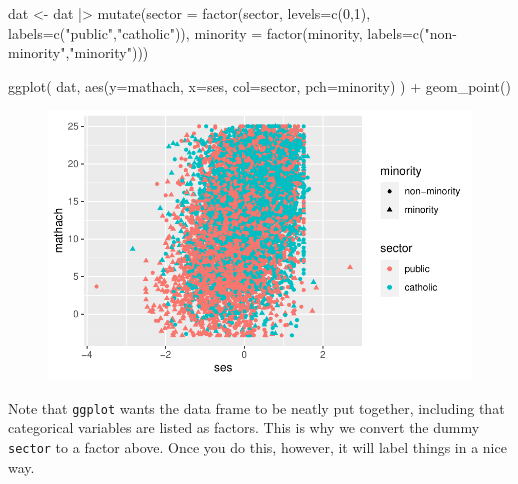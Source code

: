 \documentclass[
  letterpaper,
  DIV=11,
  numbers=noendperiod]{scrreprt}
\newenvironment{Shaded}{\begin{snugshade}}{\end{snugshade}}
\newcommand{\AttributeTok}[1]{\textcolor[rgb]{0.49,0.56,0.16}{#1}}
\newcommand{\DecValTok}[1]{\textcolor[rgb]{0.25,0.63,0.44}{#1}}
\newcommand{\FunctionTok}[1]{\textcolor[rgb]{0.02,0.16,0.49}{#1}}
\newcommand{\NormalTok}[1]{\textcolor[rgb]{0.00,0.44,0.13}{#1}}
\newcommand{\OtherTok}[1]{\textcolor[rgb]{0.00,0.44,0.13}{#1}}
\newcommand{\SpecialCharTok}[1]{\textcolor[rgb]{0.25,0.44,0.63}{#1}}
\newcommand{\StringTok}[1]{\textcolor[rgb]{0.25,0.44,0.63}{#1}}
\begin{document}
\begin{Shaded}
\begin{Highlighting}[]
\NormalTok{dat }\OtherTok{\textless{}{-}}\NormalTok{ dat }\SpecialCharTok{|\textgreater{}} 
  \FunctionTok{mutate}\NormalTok{(}\AttributeTok{sector =} \FunctionTok{factor}\NormalTok{(sector, }\AttributeTok{levels=}\FunctionTok{c}\NormalTok{(}\DecValTok{0}\NormalTok{,}\DecValTok{1}\NormalTok{), }\AttributeTok{labels=}\FunctionTok{c}\NormalTok{(}\StringTok{"public"}\NormalTok{,}\StringTok{"catholic"}\NormalTok{)),}
         \AttributeTok{minority =} \FunctionTok{factor}\NormalTok{(minority, }\AttributeTok{labels=}\FunctionTok{c}\NormalTok{(}\StringTok{"non{-}minority"}\NormalTok{,}\StringTok{"minority"}\NormalTok{)))}

\FunctionTok{ggplot}\NormalTok{( dat, }\FunctionTok{aes}\NormalTok{(}\AttributeTok{y=}\NormalTok{mathach, }\AttributeTok{x=}\NormalTok{ses, }\AttributeTok{col=}\NormalTok{sector, }\AttributeTok{pch=}\NormalTok{minority) ) }\SpecialCharTok{+} 
  \FunctionTok{geom\_point}\NormalTok{()}
\end{Highlighting}
\end{Shaded}

\begin{figure}[H]

{\centering \includegraphics{intro_ggplot_files/figure-pdf/unnamed-chunk-3-1.pdf}

}

\end{figure}

Note that \texttt{ggplot} wants the data frame to be neatly put
together, including that categorical variables are listed as factors.
This is why we convert the dummy \texttt{sector} to a factor above. Once
you do this, however, it will label things in a nice way.
\end{document}
